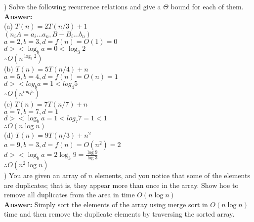 \documentclass{article}
\begin{document}
\vspace{.3in}
) Solve the following recurrence relations and give a $\Theta$ bound for each of them.\\
\vspace{.1in}
{\bf Answer:} \\
\indent (a) $T(n) = 2T(n/3) + 1$ \\
\indent \indent $(n_{i} A = a_{i} ...a_{n}, B - B_{i} ...b_{n})$ \\
\indent \indent $a = 2, b = 3, d = f(n) = O(1) = 0 $ \\
\indent \indent $d>< \log_b a = 0 < \log_3 2$ \\
\indent \indent $\therefore O(n^{\log_3 2})$ \\

\indent (b) $T(n) = 5T(n/4) + n$ \\
\indent \indent $a = 5, b = 4, d = f(n) = O(n) = 1$ \\
\indent \indent $d ><log_b a = 1 < log_4 5$ \\
\indent \indent $\therefore O(n^{log_4 5})$ \\

\indent (c) $T(n) = 7T(n/7) + n$ \\
\indent \indent $a = 7, b = 7, d = 1$ \\
\indent \indent $d >< \log_b a = 1 < log_7 7 = 1 < 1$ \\
\indent \indent $\therefore O(n \log n)$ \\

\indent (d) $T(n) = 9T(n/3) + n^2$ \\
\indent \indent $a = 9, b = 3, d = f(n) = O(n^2) = 2$ \\
\indent \indent $d >< \log_b a = 2 \log_3 9 = \frac{\log 9} {\log 3}$ \\
\indent \indent $\therefore O(n^{2} \log n)$ \\

\vspace{.3in}
) You are given an array of $n$ elements, and you notice that some of the elements are duplicates; that is, they appear more than once in the array. Show hoe to remove all duplicates from the area in time $O(n \log n)$\\
\vspace{.1in}
{\bf Answer:} Simply sort the elements of the array using merge sort in $O(n \log n)$ time and then remove the duplicate elements by traversing the sorted array.\\
\end{document}
